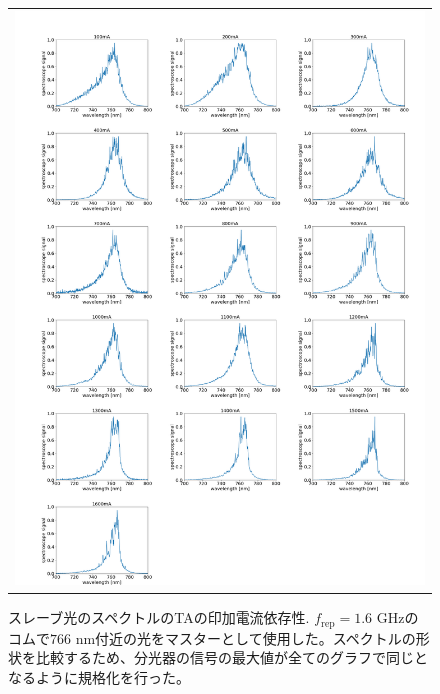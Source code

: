 \documentclass[uplatex, dvipdfmx, a4paper, report, papersize, 11pt]{jsbook}
\begin{document}
\newpage
\begin{figure}[H]
  \centering
    \begin{tabular}{c}
      \begin{minipage}{1\hsize}
        \centering
          \includegraphics[keepaspectratio,  scale=0.23,  angle=0]
                          {figures/chapter4/760_slave-current_spectrum_astro.png}
                          \caption{スレーブ光のスペクトルのTAの印加電流依存性. $f_\mathrm{rep} = 1.6$ GHzのコムで$766$ nm付近の光をマスターとして使用した。スペクトルの形状を比較するため、分光器の信号の最大値が全てのグラフで同じとなるように規格化を行った。}
                          \label{760_slave-current_spectrum_astro}
      \end{minipage}
  \end{tabular}
\end{figure}
\end{document}
